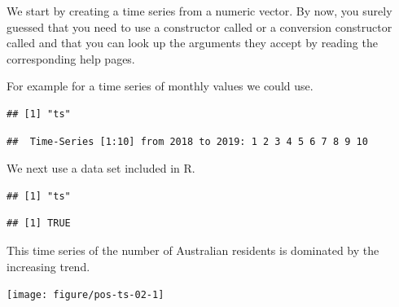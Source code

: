 \documentclass[krantz2]{krantz}\usepackage{knitr}%
\begin{document}
We start by creating a time series from a numeric vector. By now, you surely guessed that you need to use a constructor called  or a conversion constructor called  and that you can look up the arguments they accept by reading the corresponding help pages.

For example for a time series of monthly values we could use.
\begin{knitrout}\footnotesize
{}\color{fgcolor}\begin{kframe}
\begin{alltt}
 \hlkwb{<-} \hlstd{(}\hlopt{:}\hlstd{,}  \hlstd{=} \hlstd{,}  \hlstd{=} \hlopt{/}\hlstd{)}
\end{alltt}
\begin{verbatim}
## [1] "ts"
\end{verbatim}
\begin{alltt}
\end{alltt}
\begin{verbatim}
##  Time-Series [1:10] from 2018 to 2019: 1 2 3 4 5 6 7 8 9 10
\end{verbatim}
\end{kframe}
\end{knitrout}

We next use a data set included in R.
\begin{knitrout}\footnotesize
{}\color{fgcolor}\begin{kframe}
\begin{alltt}
\end{alltt}
\begin{verbatim}
## [1] "ts"
\end{verbatim}
\begin{alltt}
\end{alltt}
\begin{verbatim}
## [1] TRUE
\end{verbatim}
\end{kframe}
\end{knitrout}



This time series of the number of Australian residents is dominated by the increasing trend.
\begin{knitrout}\footnotesize
{}\color{fgcolor}\begin{kframe}
\begin{alltt}
\end{alltt}
\end{kframe}

{\centering \texttt{[image: figure/pos-ts-02-1]} 

}



\end{knitrout}
\end{document}

